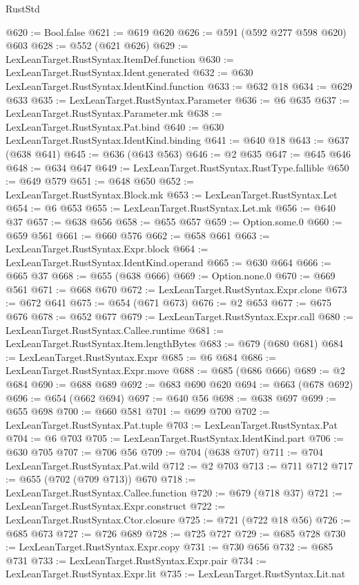 \begin{lexlean}{RustStd}
\begin{coremodule}
@620 := Bool.false
@621 := @619 @620
@626 := @591 (@592 @277 @598 @620) @603
@628 := @552 (@621 @626)
@629 := LexLeanTarget.RustSyntax.ItemDef.function
@630 := LexLeanTarget.RustSyntax.Ident.generated
@632 := @630 LexLeanTarget.RustSyntax.IdentKind.function
@633 := @632 @18
@634 := @629 @633
@635 := LexLeanTarget.RustSyntax.Parameter
@636 := @6 @635
@637 := LexLeanTarget.RustSyntax.Parameter.mk
@638 := LexLeanTarget.RustSyntax.Pat.bind
@640 := @630 LexLeanTarget.RustSyntax.IdentKind.binding
@641 := @640 @18
@643 := @637 (@638 @641)
@645 := @636 (@643 @563)
@646 := @2 @635
@647 := @645 @646
@648 := @634 @647
@649 := LexLeanTarget.RustSyntax.RustType.fallible
@650 := @649 @579
@651 := @648 @650
@652 := LexLeanTarget.RustSyntax.Block.mk
@653 := LexLeanTarget.RustSyntax.Let
@654 := @6 @653
@655 := LexLeanTarget.RustSyntax.Let.mk
@656 := @640 @37
@657 := @638 @656
@658 := @655 @657
@659 := Option.some.{0}
@660 := @659 @561
@661 := @660 @576
@662 := @658 @661
@663 := LexLeanTarget.RustSyntax.Expr.block
@664 := LexLeanTarget.RustSyntax.IdentKind.operand
@665 := @630 @664
@666 := @665 @37
@668 := @655 (@638 @666)
@669 := Option.none.{0}
@670 := @669 @561
@671 := @668 @670
@672 := LexLeanTarget.RustSyntax.Expr.clone
@673 := @672 @641
@675 := @654 (@671 @673)
@676 := @2 @653
@677 := @675 @676
@678 := @652 @677
@679 := LexLeanTarget.RustSyntax.Expr.call
@680 := LexLeanTarget.RustSyntax.Callee.runtime
@681 := LexLeanTarget.RustSyntax.Item.lengthBytes
@683 := @679 (@680 @681)
@684 := LexLeanTarget.RustSyntax.Expr
@685 := @6 @684
@686 := LexLeanTarget.RustSyntax.Expr.move
@688 := @685 (@686 @666)
@689 := @2 @684
@690 := @688 @689
@692 := @683 @690 @620
@694 := @663 (@678 @692)
@696 := @654 (@662 @694)
@697 := @640 @56
@698 := @638 @697
@699 := @655 @698
@700 := @660 @581
@701 := @699 @700
@702 := LexLeanTarget.RustSyntax.Pat.tuple
@703 := LexLeanTarget.RustSyntax.Pat
@704 := @6 @703
@705 := LexLeanTarget.RustSyntax.IdentKind.part
@706 := @630 @705
@707 := @706 @56
@709 := @704 (@638 @707)
@711 := @704 LexLeanTarget.RustSyntax.Pat.wild
@712 := @2 @703
@713 := @711 @712
@717 := @655 (@702 (@709 @713)) @670
@718 := LexLeanTarget.RustSyntax.Callee.function
@720 := @679 (@718 @37)
@721 := LexLeanTarget.RustSyntax.Expr.construct
@722 := LexLeanTarget.RustSyntax.Ctor.closure
@725 := @721 (@722 @18 @56)
@726 := @685 @673
@727 := @726 @689
@728 := @725 @727
@729 := @685 @728
@730 := LexLeanTarget.RustSyntax.Expr.copy
@731 := @730 @656
@732 := @685 @731
@733 := LexLeanTarget.RustSyntax.Expr.pair
@734 := LexLeanTarget.RustSyntax.Expr.lit
@735 := LexLeanTarget.RustSyntax.Lit.nat

\end{coremodule}
\end{lexlean}
